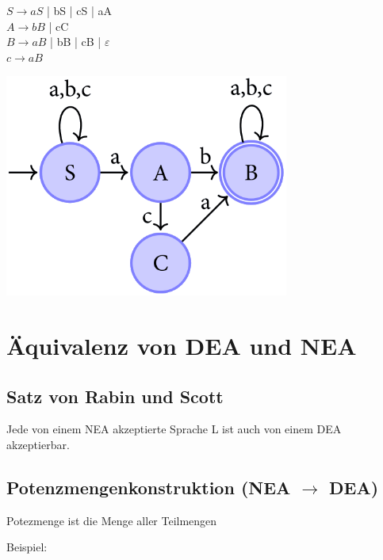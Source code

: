 \documentclass[11pt, a4paper]{scrartcl}
\begin{document}
\begin{minipage}[h]{0.45\textwidth}
    $S \rightarrow aS$ | bS | cS | aA \\
    $A \rightarrow bB$ | cC \\
    $B \rightarrow aB$ | bB | cB | $\varepsilon$ \\
    $c \rightarrow aB$
\end{minipage}
\begin{minipage}[h]{0.45\textwidth}
    \includegraphics[width=0.7\textwidth]{NEA-00.png}
\end{minipage}

\newpage

\section{Äquivalenz von DEA und NEA}

\subsection{Satz von Rabin und Scott}

Jede von einem NEA akzeptierte Sprache L ist auch von einem DEA akzeptierbar.

\subsection{Potenzmengenkonstruktion (NEA $\rightarrow$ DEA)}

Potezmenge ist die Menge aller Teilmengen



\vspace{2em}

Beispiel:

\vspace{0.5em}
\end{document}
